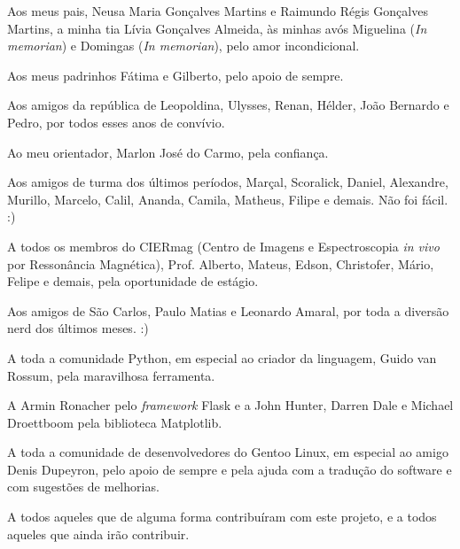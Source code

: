 \begin{agradecimentos}
    
Aos meus pais, Neusa Maria Gonçalves Martins e Raimundo Régis Gonçalves
Martins, a minha tia Lívia Gonçalves Almeida, às minhas avós Miguelina
(\textit{In memorian}) e Domingas (\textit{In memorian}), pelo amor
incondicional.

Aos meus padrinhos Fátima e Gilberto, pelo apoio de sempre.

Aos amigos da república de Leopoldina, Ulysses, Renan, Hélder, João Bernardo
e Pedro, por todos esses anos de convívio.

Ao meu orientador, Marlon José do Carmo, pela confiança.

Aos amigos de turma dos últimos períodos, Marçal, Scoralick, Daniel,
Alexandre, Murillo, Marcelo, Calil, Ananda, Camila, Matheus, Filipe e
demais. Não foi fácil. :)

A todos os membros do CIERmag (Centro de Imagens e Espectroscopia
\textit{in vivo} por Ressonância Magnética), Prof. Alberto, Mateus, Edson,
Christofer, Mário, Felipe e demais, pela oportunidade de estágio.

Aos amigos de São Carlos, Paulo Matias e Leonardo Amaral, por toda a diversão
nerd dos últimos meses. :)

A toda a comunidade Python, em especial ao criador da linguagem, Guido
van Rossum, pela maravilhosa ferramenta.

A Armin Ronacher pelo \textit{framework} Flask e a John Hunter, Darren
Dale e Michael Droettboom pela biblioteca Matplotlib.

A toda a comunidade de desenvolvedores do Gentoo Linux, em especial ao
amigo Denis Dupeyron, pelo apoio de sempre e pela ajuda com a tradução do
software e com sugestões de melhorias.

A todos aqueles que de alguma forma contribuíram com este projeto, e a
todos aqueles que ainda irão contribuir.

\end{agradecimentos}
